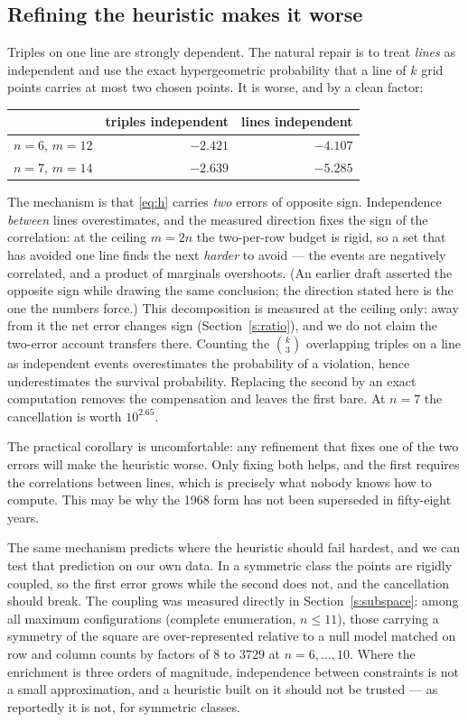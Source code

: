 \documentclass[11pt,a4paper]{article}
\begin{document}
\subsection{Refining the heuristic makes it worse}\label{s:refine}
Triples on one line are strongly dependent.  The natural repair is to treat \emph{lines} as
independent and use the exact hypergeometric probability that a line of $k$ grid points carries at
most two chosen points.  It is worse, and by a clean factor:
\begin{center}
\begin{tabular}{rrr}
\toprule
 & triples independent & lines independent \\
\midrule
$n=6$, $m=12$ & $-2.421$ & $-4.107$\\
$n=7$, $m=14$ & $-2.639$ & $-5.285$\\
\bottomrule
\end{tabular}
\end{center}
The mechanism is that \eqref{eq:h} carries \emph{two} errors of opposite sign.  Independence
\emph{between} lines overestimates, and the measured direction fixes the sign of the correlation:
at the ceiling $m=2n$ the two-per-row budget is rigid, so a set that has avoided one line finds
the next \emph{harder} to avoid --- the events are negatively correlated, and a product of
marginals overshoots.  (An earlier draft asserted the opposite sign while drawing the same
conclusion; the direction stated here is the one the numbers force.)  This decomposition is
measured at the ceiling only: away from it the net error changes sign (Section~\ref{s:ratio}), and we do not
claim the two-error account transfers there.  Counting the $\binom{k}{3}$ overlapping triples on a line as independent events
overestimates the probability of a violation, hence underestimates the survival probability.
Replacing the second by an exact computation removes the compensation and leaves the first bare.
At $n=7$ the cancellation is worth $10^{2.65}$.

The practical corollary is uncomfortable: any refinement that fixes one of the two errors will make
the heuristic worse.  Only fixing both helps, and the first requires the correlations between lines,
which is precisely what nobody knows how to compute.  This may be why the 1968 form has not been
superseded in fifty-eight years.

The same mechanism predicts where the heuristic should fail hardest, and we can test that
prediction on our own data.  In a symmetric class the points are rigidly coupled, so the first
error grows while the second does not, and the cancellation should break.  The coupling was
measured directly in Section~\ref{s:subspace}: among all maximum configurations (complete enumeration, $n\le11$), those
carrying a symmetry of the square are over-represented relative to a null model matched on row and
column counts by factors of $8$ to $3729$ at $n=6,\dots,10$.
Where the enrichment is three orders of magnitude, independence between constraints is not a
small approximation, and a heuristic built on it should not be trusted --- as reportedly it is
not, for symmetric classes.
\end{document}
